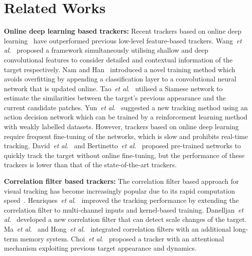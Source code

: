 \documentclass[10pt,twocolumn,letterpaper]{article}
\def\etal{\emph{et al}.}
\begin{document}
\section{Related Works}

\textbf{Online deep learning based trackers:}
Recent trackers based on online deep learning~\cite{ref:FCNT, ref:MDNet,ref:SINT,ref:STCT,ref:yun} have outperformed previous low-level feature-based trackers. Wang~\etal~\cite{ref:FCNT} proposed a framework simultaneously utilising shallow and deep convolutional features to consider detailed and contextual information of the target respectively.
Nam and Han~\cite{ref:MDNet} introduced a novel training method which
avoids overfitting by appending a classification layer to a convolutional neural network that is updated online. Tao~\etal~\cite{ref:SINT} utilised a Siamese network to estimate the similarities between the target's previous appearance and the current candidate patches.
Yun~\etal~\cite{ref:yun} suggested a new tracking method using an action decision network
which can be trained by a reinforcement learning method with weakly labelled datasets.
However, trackers based on online deep learning require frequent fine-tuning of the networks, which is slow and prohibits real-time tracking.
David~\etal~\cite{ref:goturn} and Bertinetto~\etal~\cite{ref:SiamFC} proposed pre-trained networks to quickly track the target without online fine-tuning, but the performance of these trackers is lower than that of the state-of-the-art trackers.


\textbf{Correlation filter based trackers:}
The correlation filter based approach for visual tracking has become increasingly popular due to its rapid computation speed~\cite{ref:KCF, ref:MOSSE, ref:DSST, ref:LongCT, ref:MUSTer, ref:SCT, ref:ACFN}.
Henriques~\etal~\cite{ref:KCF} improved the tracking performance by extending the correlation filter to multi-channel inputs and kernel-based training.
Danelljan~\etal~\cite{ref:DSST} developed a new correlation filter that can detect scale changes of the target. Ma~\etal~\cite{ref:LongCT} and Hong~\etal~\cite{ref:MUSTer} integrated correlation filters with an additional long-term memory system.
Choi~\etal~\cite{ref:ACFN} proposed a tracker with an attentional mechanism exploiting previous target appearance and dynamics.
\end{document}
